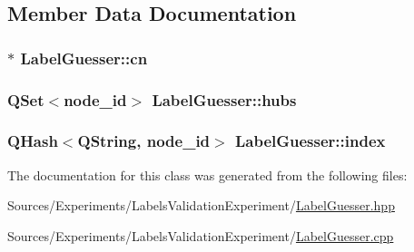 \subsection{Member Data Documentation}
\hypertarget{class_label_guesser_acdd5ba09b2a6aa6fadc4b64798bd4e75}{
\subsubsection[{cn}]{$\ast$ Label\+Guesser\+::cn\hspace{0.3cm}{\ttfamily [private]}}}\label{class_label_guesser_acdd5ba09b2a6aa6fadc4b64798bd4e75}
\hypertarget{class_label_guesser_a9a1306e306ecf90e6d886a45a1ed16f7}{
\subsubsection[{hubs}]{\setlength{\rightskip}{0pt plus 5cm}Q\+Set$<$node\+\_\+id$>$ Label\+Guesser\+::hubs\hspace{0.3cm}{\ttfamily [private]}}}\label{class_label_guesser_a9a1306e306ecf90e6d886a45a1ed16f7}
\hypertarget{class_label_guesser_ae88b5f0ad103084c7c8d7326c4bd7251}{
\subsubsection[{index}]{\setlength{\rightskip}{0pt plus 5cm}Q\+Hash$<$Q\+String, node\+\_\+id$>$ Label\+Guesser\+::index\hspace{0.3cm}{\ttfamily [private]}}}\label{class_label_guesser_ae88b5f0ad103084c7c8d7326c4bd7251}


The documentation for this class was generated from the following files\+:\begin{DoxyCompactItemize}
\item 
Sources/\+Experiments/\+Labels\+Validation\+Experiment/\hyperlink{_label_guesser_8hpp}{Label\+Guesser.\+hpp}\item 
Sources/\+Experiments/\+Labels\+Validation\+Experiment/\hyperlink{_label_guesser_8cpp}{Label\+Guesser.\+cpp}\end{DoxyCompactItemize}
